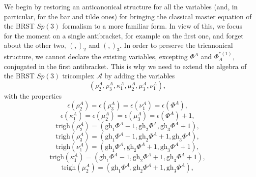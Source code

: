 \documentclass[a4paper,12pt]{article}
\begin{document}
We begin by restoring an anticanonical structure for all the variables (and,
in particular, for the bar and tilde ones) for bringing the classical master
equation of the BRST $Sp(3)$ formalism to a more familiar form. In view of
this, we focus for the moment on a single antibracket, for example on the
first one, and forget about the other two, $\left( ,\right) _{2}$ and $%
\left( ,\right) _{3}$. In order to preserve the tricanonical structure, we
cannot declare the existing variables, excepting $\Phi ^{A}$ and $\Phi
_{A}^{*(1)}$, conjugated in the first antibracket. This is why we need to
extend the algebra of the BRST $Sp(3)$ tricomplex $\mathcal{A}$ by adding
the variables 
\begin{equation}
\left( \rho _{2}^{A},\rho _{3}^{A},\kappa _{1}^{A},\mu _{2}^{A},\mu
_{3}^{A},\nu _{1}^{A}\right) ,  \label{sp3.100a}
\end{equation}
with the properties 
\begin{equation}
\epsilon \left( \rho _{2}^{A}\right) =\epsilon \left( \rho _{3}^{A}\right)
=\epsilon \left( \nu _{1}^{A}\right) =\epsilon \left( \Phi ^{A}\right) ,
\label{sp3.100}
\end{equation}
\begin{equation}
\epsilon \left( \kappa _{1}^{A}\right) =\epsilon \left( \mu _{2}^{A}\right)
=\epsilon \left( \mu _{3}^{A}\right) =\epsilon \left( \Phi ^{A}\right) +1,
\label{sp3.101}
\end{equation}
\begin{equation}
\mathrm{trigh}\left( \rho _{2}^{A}\right) =\left( \mathrm{gh}_{1}\Phi ^{A}-1,%
\mathrm{gh}_{2}\Phi ^{A},\mathrm{gh}_{3}\Phi ^{A}+1\right) ,  \label{sp3.102}
\end{equation}
\begin{equation}
\mathrm{trigh}\left( \rho _{3}^{A}\right) =\left( \mathrm{gh}_{1}\Phi ^{A}-1,%
\mathrm{gh}_{2}\Phi ^{A}+1,\mathrm{gh}_{3}\Phi ^{A}\right) ,  \label{sp3.103}
\end{equation}
\begin{equation}
\mathrm{trigh}\left( \nu _{1}^{A}\right) =\left( \mathrm{gh}_{1}\Phi ^{A},%
\mathrm{gh}_{2}\Phi ^{A}+1,\mathrm{gh}_{3}\Phi ^{A}+1\right) ,
\label{sp3.104}
\end{equation}
\begin{equation}
\mathrm{trigh}\left( \kappa _{1}^{A}\right) =\left( \mathrm{gh}_{1}\Phi
^{A}-1,\mathrm{gh}_{2}\Phi ^{A}+1,\mathrm{gh}_{3}\Phi ^{A}+1\right) ,
\label{sp3.105}
\end{equation}
\begin{equation}
\mathrm{trigh}\left( \mu _{2}^{A}\right) =\left( \mathrm{gh}_{1}\Phi ^{A},%
\mathrm{gh}_{2}\Phi ^{A}+1,\mathrm{gh}_{3}\Phi ^{A}\right) ,  \label{sp3.106}
\end{equation}
\end{document}
